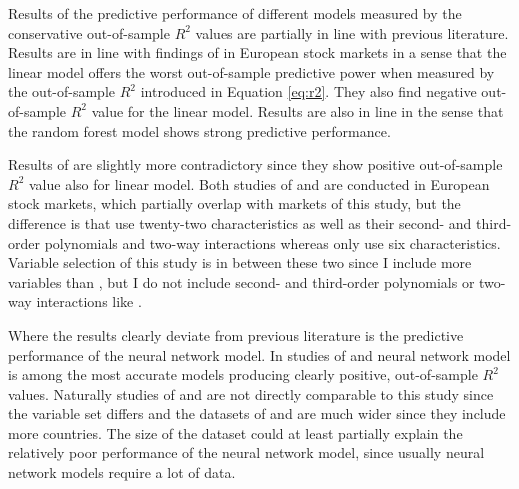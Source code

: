 \documentclass[12pt]{article}
\begin{document}
Results of the predictive performance of different models measured by the conservative out-of-sample $R^2$ values are partially in line with previous literature. Results are in line with findings of \citet{Drobetz} in European stock markets in a sense that the linear model offers the worst out-of-sample predictive power when measured by the out-of-sample $R^2$ introduced in Equation \ref{eq:r2}. They also find negative out-of-sample $R^2$ value for the linear model. Results are also in line in the sense that the random forest model shows strong predictive performance.\footnotemark {} \par

Results of \citet{Fieberg} are slightly more contradictory since they show positive out-of-sample $R^2$ value also for linear model.\footnotemark {} Both studies of \citeauthor{Drobetz} and \citeauthor{Fieberg} are conducted in European stock markets, which partially overlap with markets of this study, but the difference is that \citeauthor{Drobetz} use twenty-two characteristics as well as their  second- and third-order polynomials and two-way interactions whereas \citeauthor{Fieberg} only use six characteristics. Variable selection of this study is in between these two since I include more variables than \citeauthor{Fieberg}, but I do not include second- and third-order polynomials or two-way interactions like \citeauthor{Drobetz}.\footnotemark {} \par

Where the results clearly deviate from previous literature is the predictive performance of the neural network model. In studies of \citet{Drobetz} and \citet{Fieberg} neural network model is among the most accurate models producing clearly positive, out-of-sample $R^2$ values.\footnotemark {} Naturally studies of \citeauthor{Drobetz} and \citeauthor{Fieberg} are not directly comparable to this study since the variable set differs and the datasets of  \citeauthor{Drobetz} and \citeauthor{Fieberg} are much wider since they include more countries. The size of the dataset could at least partially explain the relatively poor performance of the neural network model, since usually neural network models require a lot of data. \par
\end{document}
